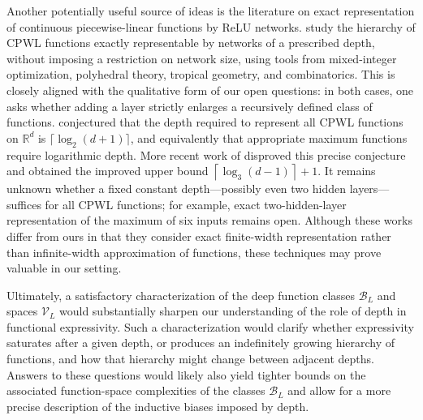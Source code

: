 \documentclass{article}
\def\cB{{\mathcal{B}}}
\def\cV{{\mathcal{V}}}
\begin{document}
Another potentially useful source of ideas is the literature on exact representation of continuous piecewise-linear functions by ReLU networks. \cite{hertrich2021towards} study the hierarchy of CPWL functions exactly representable by networks of a prescribed depth, without imposing a restriction on network size, using tools from mixed-integer optimization, polyhedral theory, tropical geometry, and combinatorics. This is closely aligned with the qualitative form of our open questions: in both cases, one asks whether adding a layer strictly enlarges a recursively defined class of functions. \cite{hertrich2021towards} conjectured that the depth required to represent all CPWL functions on $\mathbb{R}^d$ is $\lceil\log_2(d+1)\rceil$, and equivalently that appropriate maximum functions require logarithmic depth. More recent work of \cite{bakaev2026better} disproved this precise conjecture and obtained the improved upper bound $\left\lceil \log_3(d-1)\right\rceil+1$. It remains unknown whether a fixed constant depth---possibly even two hidden layers---suffices for all CPWL functions; for example, exact two-hidden-layer representation of the maximum of six inputs remains open. Although these works differ from ours in that they consider exact finite-width representation rather than infinite-width approximation of functions, these techniques may prove valuable in our setting.


Ultimately, a satisfactory characterization of the deep function classes $\cB_L$ and spaces $\cV_L$ would substantially sharpen our understanding of the role of depth in functional expressivity. Such a characterization would clarify whether expressivity saturates after a given depth, or produces an indefinitely growing hierarchy of functions, and how that hierarchy might change between adjacent depths. Answers to these questions would likely also yield tighter bounds on the associated function-space complexities of the classes $\cB_L$ and allow for a more precise description of the inductive biases imposed by depth.






\end{document}
